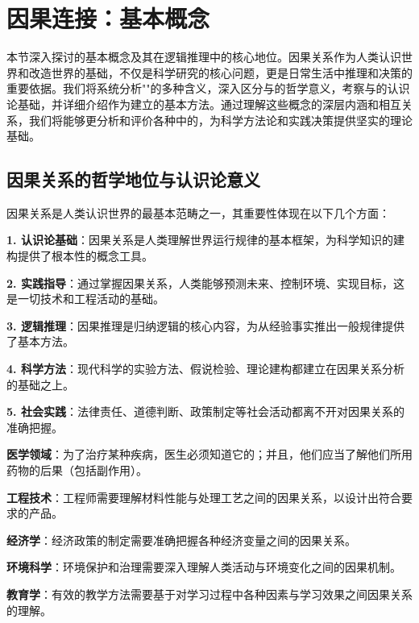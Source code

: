 \section{因果连接：基本概念}

\begin{logicbox}[title=引言]
本节深入探讨的基本概念及其在逻辑推理中的核心地位。因果关系作为人类认识世界和改造世界的基础，不仅是科学研究的核心问题，更是日常生活中推理和决策的重要依据。我们将系统分析""的多种含义，深入区分与的哲学意义，考察与的认识论基础，并详细介绍作为建立的基本方法。通过理解这些概念的深层内涵和相互关系，我们将能够更分析和评价各种中的，为科学方法论和实践决策提供坚实的理论基础。
\end{logicbox}

\subsection{因果关系的哲学地位与认识论意义}

\begin{theorembox}[title=因果关系在人类认识中的核心地位]
因果关系是人类认识世界的最基本范畴之一，其重要性体现在以下几个方面：

\textbf{1. 认识论基础}：因果关系是人类理解世界运行规律的基本框架，为科学知识的建构提供了根本性的概念工具。

\textbf{2. 实践指导}：通过掌握因果关系，人类能够预测未来、控制环境、实现目标，这是一切技术和工程活动的基础。

\textbf{3. 逻辑推理}：因果推理是归纳逻辑的核心内容，为从经验事实推出一般规律提供了基本方法。

\textbf{4. 科学方法}：现代科学的实验方法、假说检验、理论建构都建立在因果关系分析的基础之上。

\textbf{5. 社会实践}：法律责任、道德判断、政策制定等社会活动都离不开对因果关系的准确把握。
\end{theorembox}

\begin{examplebox}[title=因果关系在不同领域的重要性]
\textbf{医学领域}：为了治疗某种疾病，医生必须知道它的；并且，他们应当了解他们所用药物的后果（包括副作用）。

\textbf{工程技术}：工程师需要理解材料性能与处理工艺之间的因果关系，以设计出符合要求的产品。

\textbf{经济学}：经济政策的制定需要准确把握各种经济变量之间的因果关系。

\textbf{环境科学}：环境保护和治理需要深入理解人类活动与环境变化之间的因果机制。

\textbf{教育学}：有效的教学方法需要基于对学习过程中各种因素与学习效果之间因果关系的理解。
\end{examplebox}

